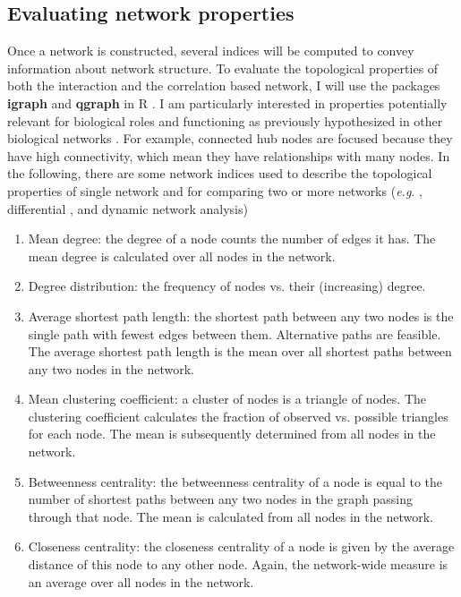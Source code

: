 \subsection*{Evaluating network properties}

Once a network is constructed, several indices will be computed to convey information about network structure. To evaluate the topological properties of both the interaction and the correlation based network, I will use the packages \textbf{igraph} and \textbf{qgraph} in \textsf{R} \citep{qgraph}. I am particularly interested in properties potentially relevant for biological roles and functioning as previously hypothesized in other biological networks \citep{Strogatz:2001wc, horvath2011weighted}. For example, connected hub nodes are focused because they have high connectivity, which mean they have relationships with many nodes. In the following, there are some network indices used to describe the topological properties of single network and for comparing two or more networks (\textit{e.g}. , differential , and dynamic network analysis) 


\begin{enumerate}
\item Mean degree: the degree of a node counts the number of edges it has. The mean degree is calculated over all nodes in the network.
\item Degree distribution: the frequency of nodes vs. their (increasing) degree.
\item Average shortest path length: the shortest path between any two nodes is the single path with fewest edges between them. Alternative paths are feasible. The average shortest path length is the mean over all shortest paths between any two nodes in the network.
\item Mean clustering coefficient: a cluster of nodes is a triangle of nodes. The clustering coefficient calculates the fraction of observed vs. possible triangles for each node. The mean is subsequently determined from all nodes in the network.
\item Betweenness centrality: the betweenness centrality of a node is equal to the number of shortest paths between any two nodes in the graph passing through that node. The mean is calculated from all nodes in the network.
\item Closeness centrality: the closeness centrality of a node is given by the average distance of this node to any other node. Again, the network-wide measure is an average over all nodes in the network.
\end{enumerate}


